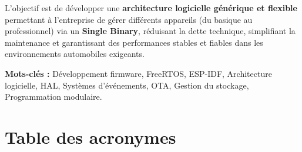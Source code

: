 \medskip\noindent
L'objectif est de développer une \textbf{architecture logicielle générique
et flexible} permettant à l'entreprise de gérer différents appareils (du
basique au professionnel) via un \textbf{Single Binary}, réduisant la
dette technique, simplifiant la maintenance et garantissant des
performances stables et fiables dans les environnements automobiles
exigeants.

\bigskip\noindent
\textbf{Mots-clés :} Développement firmware, FreeRTOS, ESP-IDF,
Architecture logicielle, HAL, Systèmes d'événements, OTA,
Gestion du stockage, Programmation modulaire.
\newpage
\chapter*{Table des acronymes}


